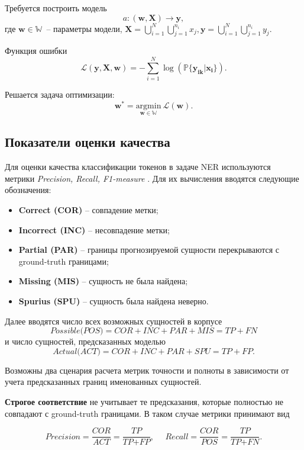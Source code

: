\documentclass[12pt, a4paper]{article} %
\begin{document}
Требуется построить модель
	$$\mathit{a} : (\mathbf{w}, \mathbf{X})\rightarrow\mathbf{y},$$
	где	$\mathbf{w} \in \mathbb{W}$~-- параметры модели, $\mathbf{X} = \bigcup_{i=1}^N\bigcup_{j=1}^{n_i} \mathit{x}_j, \mathbf{y} = \bigcup_{i=1}^N\bigcup_{j=1}^{n_i} \mathit{y}_j$.

Функция ошибки
	$$\mathcal{L}\left(\mathbf{y}, \mathbf{X}, \mathbf{w}\right)=-\sum_{i=1}^{N}\log(\mathbb{P\{\mathbf{y_{ik}}|\mathbf{x_{i}}\}}).$$

Решается задача оптимизации: 
	$$\textbf{w}^* = \underset{\mathbf{w}\in\mathbb{W}}{\text{argmin}} ~ \mathcal{L}(\textbf{w}).$$

 

\subsection{Показатели оценки качества}
Для оценки качества классификации токенов в задаче NER используются метрики \textit{Precision, Recall, F1-measure} \cite{Chinchor1993}. Для их вычисления вводятся следующие обозначения:
\begin{itemize}
	\item \textbf{Correct (COR)} -- совпадение метки;
	\item \textbf{Incorrect (INC)} -- несовпадение метки;
	\item \textbf{Partial (PAR)} -- границы прогнозируемой сущности перекрываются с ground-truth границами;
	\item \textbf{Missing (MIS)} -- сущность не была найдена;
	\item \textbf{Spurius (SPU)} -- сущность была найдена неверно.
\end{itemize}

Далее вводятся число всех возможных сущностей в корпусе
$$\textit{Possible(POS)}=\textit{COR} + \textit{INC} + \textit{PAR} + \textit{MIS}=\textit{TP} + \textit{FN}$$
и число сущностей, предсказанных моделью
$$\textit{Actual(ACT)}=\textit{COR} + \textit{INC} + \textit{PAR} + \textit{SPU}=\textit{TP} + \textit{FP}.$$

Возможны два сценария расчета метрик точности и полноты в зависимости от учета предсказанных границ именованных сущностей.

\textbf{Строгое соответствие} не учитывает те предсказания, которые полностью не совпадают с ground-truth границами. В таком случае метрики принимают вид

$$\textit{Precision}=\frac{\textit{COR}}{\textit{ACT}}=\frac{\textit{TP}}{\textit{TP}+\textit{FP}}, ~~~~~~ \textit{Recall}=\frac{\textit{COR}}{\textit{POS}}=\frac{\textit{TP}}{\textit{TP}+\textit{FN}}.$$ 
\end{document}

